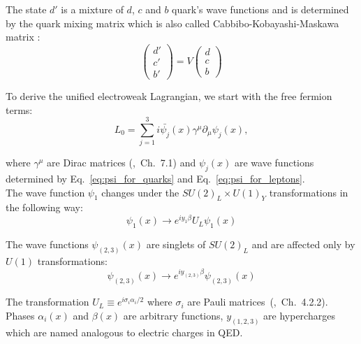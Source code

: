 The state $d'$ is a mixture of $d$, $c$ and $b$ quark's wave functions and is determined by the quark mixing matrix which is also called Cabbibo-Kobayashi-Maskawa matrix \cite{ref_Pich}:\\

\begin{equation}
  \begin{pmatrix} d' \\ c' \\ b' \end{pmatrix} = V
  \begin{pmatrix} d \\ c \\ b \end{pmatrix}
\end{equation}

To derive the unified electroweak Lagrangian, we start with the free fermion terms:\\

\begin{equation}\label{eq:L_free}
L_0 = \sum_{j=1}^{3} i \bar{\psi_j}(x) \gamma^\mu \partial_\mu \psi_j(x), 
\end{equation}

where $\gamma^\mu$ are Dirac matrices (\cite{ref_Griffiths},~Ch.~7.1) and $\psi_j(x)$ are wave functions determined by Eq.~\ref{eq:psi_for_quarks} and Eq.~\ref{eq:psi_for_leptons}.\\

The wave function $\psi_1$ changes under the $SU(2)_L \times U(1)_Y$ transformations in the following way:\\

\begin{equation}
\psi_1(x) \rightarrow e^{i y_1 \beta} U_L \psi_1(x)
\end{equation}

The wave functions $\psi_{(2,3)}(x)$ are singlets of $SU(2)_L$ and are affected only by $U(1)$ transformations:\\

\begin{equation}
\psi_{(2,3)}(x) \rightarrow e^{i y_{(2,3)} \beta} \psi_{(2,3)}(x)
\end{equation}

The transformation $U_L \equiv e^{i \sigma_i \alpha_i /2}$ where $\sigma_i$ are Pauli matrices~(\cite{ref_Griffiths},~Ch.~4.2.2). Phases  $\alpha_i(x)$ and $\beta(x)$ are arbitrary functions, $y_{(1,2,3)}$ are hypercharges which are named analogous to electric charges in QED.\\

